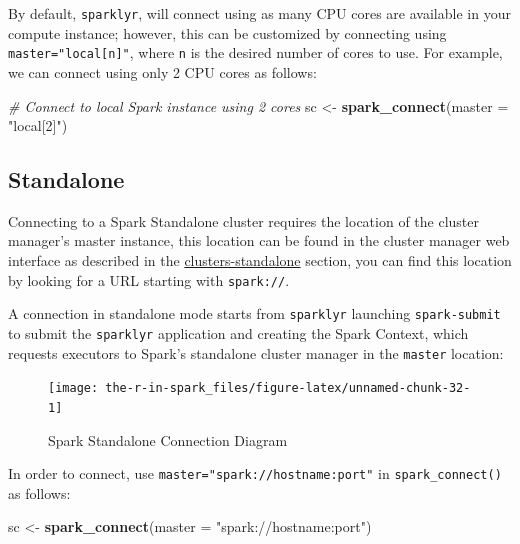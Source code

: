 \documentclass[]{book}
\newenvironment{Shaded}{\begin{snugshade}}{\end{snugshade}}
\newcommand{\CommentTok}[1]{\textcolor[rgb]{0.56,0.35,0.01}{\textit{#1}}}
\newcommand{\DataTypeTok}[1]{\textcolor[rgb]{0.13,0.29,0.53}{#1}}
\newcommand{\KeywordTok}[1]{\textcolor[rgb]{0.13,0.29,0.53}{\textbf{#1}}}
\newcommand{\NormalTok}[1]{#1}
\newcommand{\StringTok}[1]{\textcolor[rgb]{0.31,0.60,0.02}{#1}}
\theoremstyle{definition}
\theoremstyle{definition}
\theoremstyle{definition}
\theoremstyle{remark}
\begin{document}
By default, \texttt{sparklyr}, will connect using as many CPU cores are
available in your compute instance; however, this can be customized by
connecting using \texttt{master="local{[}n{]}"}, where \texttt{n} is the
desired number of cores to use. For example, we can connect using only 2
CPU cores as follows:

\begin{Shaded}
\begin{Highlighting}[]
\CommentTok{# Connect to local Spark instance using 2 cores}
\NormalTok{sc <-}\StringTok{ }\KeywordTok{spark_connect}\NormalTok{(}\DataTypeTok{master =} \StringTok{"local[2]"}\NormalTok{)}
\end{Highlighting}
\end{Shaded}

\hypertarget{standalone}{%
\subsection{Standalone}\label{standalone}}

Connecting to a Spark Standalone cluster requires the location of the
cluster manager's master instance, this location can be found in the
cluster manager web interface as described in the
\href{standalone\%20cluster}{clusters-standalone} section, you can find
this location by looking for a URL starting with \texttt{spark://}.

A connection in standalone mode starts from \texttt{sparklyr} launching
\texttt{spark-submit} to submit the \texttt{sparklyr} application and
creating the Spark Context, which requests executors to Spark's
standalone cluster manager in the \texttt{master} location:

\begin{figure}

{\centering \texttt{[image: the-r-in-spark\_files/figure-latex/unnamed-chunk-32-1]} 

}

\caption{Spark Standalone Connection Diagram}\label{fig:unnamed-chunk-32}
\end{figure}

In order to connect, use \texttt{master="spark://hostname:port"} in
\texttt{spark\_connect()} as follows:

\begin{Shaded}
\begin{Highlighting}[]
\NormalTok{sc <-}\StringTok{ }\KeywordTok{spark_connect}\NormalTok{(}\DataTypeTok{master =} \StringTok{"spark://hostname:port"}\NormalTok{)}
\end{Highlighting}
\end{Shaded}
\end{document}
